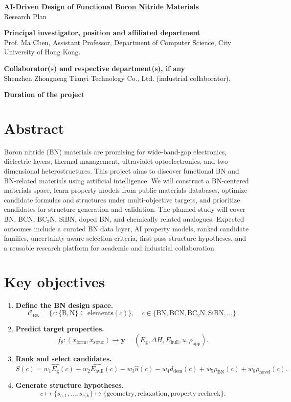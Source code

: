 \documentclass[10pt]{article}
\newcommand{\blank}[1][8em]{\colorbox{yellow!35}{\rule{0pt}{1.1em}\hspace{#1}}}
\newcommand{\eg}{E_{\mathrm{g}}}
\newcommand{\ehull}{E_{\mathrm{hull}}}
\newcommand{\form}{x_{\mathrm{form}}}
\newcommand{\struc}{x_{\mathrm{struc}}}
\newcommand{\unc}{u}
\newcommand{\domain}{d_{\mathrm{dom}}}
\begin{document}
\begin{center}
{\Large \textbf{AI-Driven Design of Functional Boron Nitride Materials}}\\
{\normalsize Research Plan}
\end{center}

\textbf{Principal investigator, position and affiliated department}\\
Prof. Ma Chen, Assistant Professor, Department of Computer Science, City University of Hong Kong.

\textbf{Collaborator(s) and respective department(s), if any}\\
Shenzhen Zhongneng Tianyi Technology Co., Ltd. (industrial collaborator).

\textbf{Duration of the project}\\
\blank[18em]

\section*{Abstract}
Boron nitride (BN) materials are promising for wide-band-gap electronics, dielectric layers, thermal management, ultraviolet optoelectronics, and two-dimensional heterostructures. This project aims to discover functional BN and BN-related materials using artificial intelligence. We will construct a BN-centered materials space, learn property models from public materials databases, optimize candidate formulas and structures under multi-objective targets, and prioritize candidates for structure generation and validation. The planned study will cover BN, BCN, BC$_2$N, SiBN, doped BN, and chemically related analogues. Expected outcomes include a curated BN data layer, AI property models, ranked candidate families, uncertainty-aware selection criteria, first-pass structure hypotheses, and a reusable research platform for academic and industrial collaboration.

\section*{Key objectives}
\begin{enumerate}
  \item \textbf{Define the BN design space.}
  \[
    \mathcal{C}_{\mathrm{BN}}=\{c:\{\mathrm{B},\mathrm{N}\}\subseteq
    \mathrm{elements}(c)\},\quad
    c\in\{\mathrm{BN},\mathrm{BCN},\mathrm{BC_2N},\mathrm{SiBN},\ldots\}.
  \]
  \item \textbf{Predict target properties.}
  \[
    f_{\theta}:(\form,\struc)\rightarrow
    \mathbf{y}=(\eg,\Delta H,\ehull,\unc,\rho_{\mathrm{app}}).
  \]
  \item \textbf{Rank and select candidates.}
  \[
    S(c)=w_1\hat{\eg}(c)-w_2\hat{\ehull}(c)-w_3\hat{\unc}(c)
    -w_4\domain(c)+w_5\rho_{\mathrm{BN}}(c)+w_6\rho_{\mathrm{novel}}(c).
  \]
  \item \textbf{Generate structure hypotheses.}
  \[
    c \mapsto \{s_{c,1},\ldots,s_{c,k}\}
    \mapsto \{\mathrm{geometry},\mathrm{relaxation},\mathrm{property\;recheck}\}.
  \]
\end{enumerate}
\end{document}
